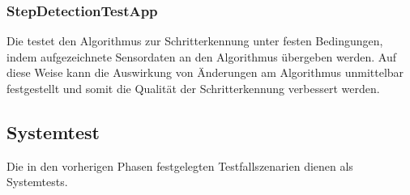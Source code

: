 \documentclass[../validierung.tex]{subfiles}
\begin{document}
\subsubsection{StepDetectionTestApp}
Die  testet den Algorithmus zur Schritterkennung unter festen Bedingungen, indem aufgezeichnete Sensordaten an den Algorithmus übergeben werden.
Auf diese Weise kann die Auswirkung von Änderungen am Algorithmus unmittelbar festgestellt und somit die Qualität der Schritterkennung verbessert werden.

\subsection{Systemtest}
Die in den vorherigen Phasen festgelegten Testfallszenarien dienen als Systemtests.
\end{document}
